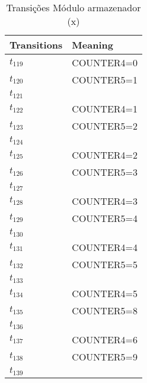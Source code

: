 \begin{table}[htbp]
\caption{Transições Módulo armazenador (x)}
\centering
\begin{tabular}{ll}
Transitions & Meaning\\
\hline
\hyperlink{partialNet:t119}{\hypertarget{partialTable:t119}{$t_{119}$}} & COUNTER4=0\\
\hyperlink{partialNet:t120}{\hypertarget{partialTable:t120}{$t_{120}$}} & COUNTER5=1\\
\hyperlink{partialNet:t121}{\hypertarget{partialTable:t121}{$t_{121}$}} & \\
\hyperlink{partialNet:t122}{\hypertarget{partialTable:t122}{$t_{122}$}} & COUNTER4=1\\
\hyperlink{partialNet:t123}{\hypertarget{partialTable:t123}{$t_{123}$}} & COUNTER5=2\\
\hyperlink{partialNet:t124}{\hypertarget{partialTable:t124}{$t_{124}$}} & \\
\hyperlink{partialNet:t125}{\hypertarget{partialTable:t125}{$t_{125}$}} & COUNTER4=2\\
\hyperlink{partialNet:t126}{\hypertarget{partialTable:t126}{$t_{126}$}} & COUNTER5=3\\
\hyperlink{partialNet:t127}{\hypertarget{partialTable:t127}{$t_{127}$}} & \\
\hyperlink{partialNet:t128}{\hypertarget{partialTable:t128}{$t_{128}$}} & COUNTER4=3\\
\hyperlink{partialNet:t129}{\hypertarget{partialTable:t129}{$t_{129}$}} & COUNTER5=4\\
\hyperlink{partialNet:t130}{\hypertarget{partialTable:t130}{$t_{130}$}} & \\
\hyperlink{partialNet:t131}{\hypertarget{partialTable:t131}{$t_{131}$}} & COUNTER4=4\\
\hyperlink{partialNet:t132}{\hypertarget{partialTable:t132}{$t_{132}$}} & COUNTER5=5\\
\hyperlink{partialNet:t133}{\hypertarget{partialTable:t133}{$t_{133}$}} & \\
\hyperlink{partialNet:t134}{\hypertarget{partialTable:t134}{$t_{134}$}} & COUNTER4=5\\
\hyperlink{partialNet:t135}{\hypertarget{partialTable:t135}{$t_{135}$}} & COUNTER5=8\\
\hyperlink{partialNet:t136}{\hypertarget{partialTable:t136}{$t_{136}$}} & \\
\hyperlink{partialNet:t137}{\hypertarget{partialTable:t137}{$t_{137}$}} & COUNTER4=6\\
\hyperlink{partialNet:t138}{\hypertarget{partialTable:t138}{$t_{138}$}} & COUNTER5=9\\
\hyperlink{partialNet:t139}{\hypertarget{partialTable:t139}{$t_{139}$}} & \\
\end{tabular}
\end{table}
